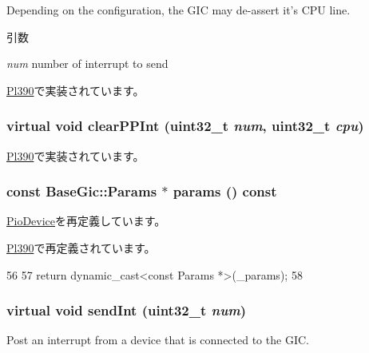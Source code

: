 Depending on the configuration, the GIC may de-\/assert it's CPU line.


\begin{DoxyParams}{引数}
\item[{\em num}]number of interrupt to send \end{DoxyParams}


\hyperlink{classPl390_a43d165dfc36b3fd1a965f2dc34eb1eda}{Pl390}で実装されています。\hypertarget{classBaseGic_ad6b86158511bccf53411efea34fb8b9a}{
\subsubsection[{clearPPInt}]{\setlength{\rightskip}{0pt plus 5cm}virtual void clearPPInt ({\bf uint32\_\-t} {\em num}, \/  {\bf uint32\_\-t} {\em cpu})}}
\label{classBaseGic_ad6b86158511bccf53411efea34fb8b9a}


\hyperlink{classPl390_a48c1db2ce97470c7d34ee199564c2929}{Pl390}で実装されています。\hypertarget{classBaseGic_ad80365b3b51c15f44416b1b835b23570}{
\subsubsection[{params}]{\setlength{\rightskip}{0pt plus 5cm}const {\bf BaseGic::Params} $\ast$ params () const}}
\label{classBaseGic_ad80365b3b51c15f44416b1b835b23570}


\hyperlink{classPioDevice_acd3c3feb78ae7a8f88fe0f110a718dff}{PioDevice}を再定義しています。

\hyperlink{classPl390_acd3c3feb78ae7a8f88fe0f110a718dff}{Pl390}で再定義されています。


\begin{DoxyCode}
56 {
57     return dynamic_cast<const Params *>(_params);
58 }
\end{DoxyCode}
\hypertarget{classBaseGic_ad6b2cb6b9a108c3852cb5a88126e5320}{
\subsubsection[{sendInt}]{\setlength{\rightskip}{0pt plus 5cm}virtual void sendInt ({\bf uint32\_\-t} {\em num})}}
\label{classBaseGic_ad6b2cb6b9a108c3852cb5a88126e5320}
Post an interrupt from a device that is connected to the GIC.


